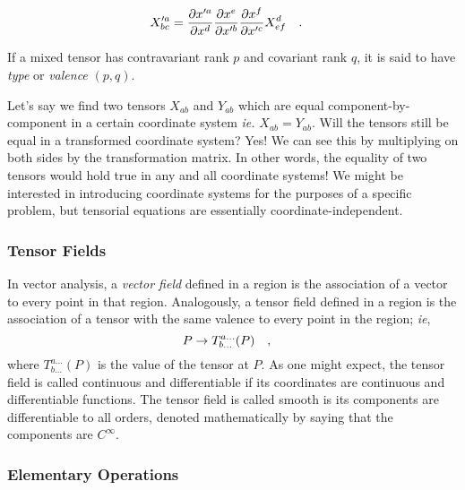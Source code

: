 \documentclass[a4paper,11pt]{article}
\begin{document}
\begin{equation}\label{key}
X'^{a}_{bc} =  \pdv{x'^a}{x^d} \pdv{x^e}{x'^b} \pdv{x^f}{x'^c} X^d_{ef} \qq{.} 
\end{equation}

If a mixed tensor has contravariant rank $ p $ and covariant rank $ q $, it is said to have \textit{type}  or \textit{valence} $ (p,q) $.

Let's say we find two tensors $ X_{ab} $ and $ Y_{ab} $ which are equal component-by-component in a certain coordinate system \textit{ie.} $ X_{ab} = Y_{ab} $. Will the tensors still be equal in a transformed coordinate system? Yes! We can see this by multiplying on both sides by the transformation matrix. In other words, the equality of two tensors would hold true in any and all coordinate systems! We might be interested in introducing coordinate systems for the purposes of a specific problem, but tensorial equations are essentially coordinate-independent.

\subsubsection{Tensor Fields}
In vector analysis, a \textit{vector field} defined in a region is the association of a vector to every point in that region. Analogously, a tensor field defined in a region is the association of a tensor with the same valence to every point in the region; \textit{ie},
\begin{equation}\label{key}
P \rightarrow T^{a \ldots}_{b\ldots} (P) \qq{,}
\end{equation}
where $  T^{a \ldots}_{b\ldots} (P) $ is the value of the tensor at $ P $. As one might expect, the tensor field is called continuous and differentiable if its coordinates are continuous and differentiable functions. The tensor field is called smooth is its components are differentiable to all orders, denoted mathematically by saying that the components are $ C^\infty $.

\subsubsection{Elementary Operations}
\end{document}
